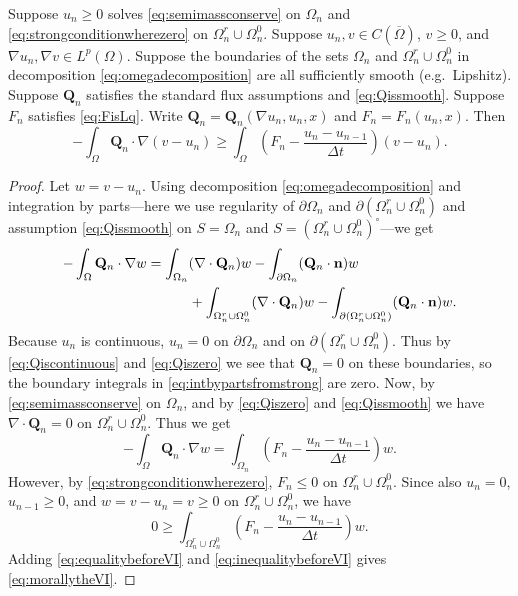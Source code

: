 \documentclass[final,leqno,onefignum,onetabnum]{siamltex1213bueler}
\newcommand\bn{\mathbf{n}}
\newcommand\bQ{\mathbf{Q}}
\newcommand{\Div}{\nabla\cdot}
\renewcommand{\grad}{\nabla}
\begin{document}
\begin{theorem} \label{thm:strongimpliesweak}  Suppose $u_n\ge 0$ solves \eqref{eq:semimassconserve} on $\Omega_n$ and \eqref{eq:strongconditionwherezero} on $\Omega_n^r \cup \Omega_n^0$.  Suppose $u_n,v\in C(\overline{\Omega})$, $v\ge 0$, and $\grad u_n,\grad v \in L^p(\Omega)$.  Suppose the boundaries of the sets $\Omega_n$ and $\Omega_n^r \cup \Omega_n^0$ in decomposition \eqref{eq:omegadecomposition} are all sufficiently smooth (e.g.~Lipshitz).  Suppose $\bQ_n$ satisfies the standard flux assumptions and \eqref{eq:Qissmooth}.  Suppose $F_n$ satisfies \eqref{eq:FisLq}.  Write $\bQ_n=\bQ_n(\grad u_n,u_n,x)$ and $F_n = F_n(u_n,x)$.  Then
\begin{equation}
-\int_{\Omega} \bQ_n \cdot \grad(v-u_n) \ge \int_{\Omega} \left(F_n - \frac{u_n - u_{n-1}}{\Delta t}\right) (v-u_n). \label{eq:morallytheVI}
\end{equation}
\end{theorem}

\begin{proof}  Let $w=v-u_n$.  Using decomposition \eqref{eq:omegadecomposition} and integration by parts---here we use regularity of $\partial \Omega_n$ and $\partial(\Omega_n^r \cup \Omega_n^0)$ and assumption \eqref{eq:Qissmooth} on $S=\Omega_n$ and $S=(\Omega_n^r \cup \Omega_n^0)^\circ$---we get
\begin{align}
-\int_{\Omega} \bQ_n \cdot \grad w &= \int_{\Omega_n} (\Div \bQ_n) w - \int_{\partial \Omega_n} (\bQ_n \cdot \bn) w \label{eq:intbypartsfromstrong} \\
  &\qquad\quad + \int_{\Omega_n^r \cup \Omega_n^0} (\Div \bQ_n) w - \int_{\partial(\Omega_n^r \cup \Omega_n^0)} (\bQ_n \cdot \bn) w. \notag
\end{align}
Because $u_n$ is continuous, $u_n=0$ on $\partial \Omega_n$ and on $\partial(\Omega_n^r \cup \Omega_n^0)$.  Thus by \eqref{eq:Qiscontinuous} and \eqref{eq:Qiszero} we see that $\bQ_n=0$ on these boundaries, so the boundary integrals in \eqref{eq:intbypartsfromstrong} are zero.  Now, by \eqref{eq:semimassconserve} on $\Omega_n$, and by \eqref{eq:Qiszero} and \eqref{eq:Qissmooth} we have $\Div \bQ_n=0$ on $\Omega_n^r \cup \Omega_n^0$.  Thus we get
\begin{equation}
-\int_{\Omega} \bQ_n \cdot \grad w = \int_{\Omega_n} \left(F_n - \frac{u_n - u_{n-1}}{\Delta t}\right) w. \label{eq:equalitybeforeVI}
\end{equation}
However, by \eqref{eq:strongconditionwherezero}, $F_n \le 0$ on $\Omega_n^r \cup \Omega_n^0$.  Since also $u_n=0$, $u_{n-1}\ge 0$, and $w = v-u_n = v \ge 0$ on $\Omega_n^r \cup \Omega_n^0$, we have
\begin{equation}
    0 \ge \int_{\Omega_n^r \cup \Omega_n^0} \left(F_n - \frac{u_n - u_{n-1}}{\Delta t}\right) w. \label{eq:inequalitybeforeVI}
\end{equation}
Adding \eqref{eq:equalitybeforeVI} and \eqref{eq:inequalitybeforeVI} gives \eqref{eq:morallytheVI}.
\end{proof}
\end{document}
